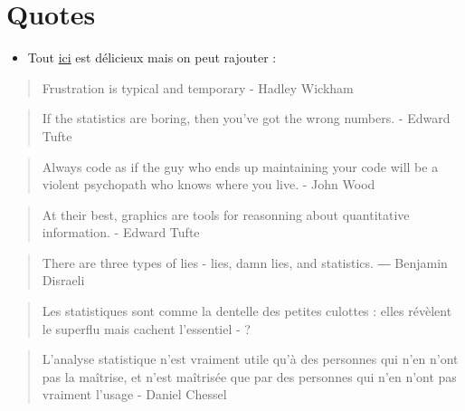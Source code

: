 \documentclass[
  letterpaper,
  DIV=11,
  numbers=noendperiod]{scrreprt}
\providecommand{\tightlist}{%
  \setlength{\itemsep}{0pt}\setlength{\parskip}{0pt}}\usepackage{longtable,booktabs,array}
\begin{document}
\hypertarget{quotes}{%
\section{Quotes}\label{quotes}}

\begin{itemize}
\tightlist
\item
  Tout \href{https://github.com/kbroman/datasciquotes}{ici} est
  délicieux mais on peut rajouter :
\end{itemize}

\begin{quote}
Frustration is typical and temporary - Hadley Wickham
\end{quote}

\begin{quote}
If the statistics are boring, then you've got the wrong numbers. -
Edward Tufte
\end{quote}

\begin{quote}
Always code as if the guy who ends up maintaining your code will be a
violent psychopath who knows where you live. - John Wood
\end{quote}

\begin{quote}
At their best, graphics are tools for reasonning about quantitative
information. - Edward Tufte
\end{quote}

\begin{quote}
There are three types of lies - lies, damn lies, and statistics. ―
Benjamin Disraeli
\end{quote}

\begin{quote}
Les statistiques sont comme la dentelle des petites culottes : elles
révèlent le superflu mais cachent l'essentiel - ?
\end{quote}

\begin{quote}
L'analyse statistique n'est vraiment utile qu'à des personnes qui n'en
n'ont pas la maîtrise, et n'est maîtrisée que par des personnes qui n'en
n'ont pas vraiment l'usage - Daniel Chessel
\end{quote}
\end{document}
